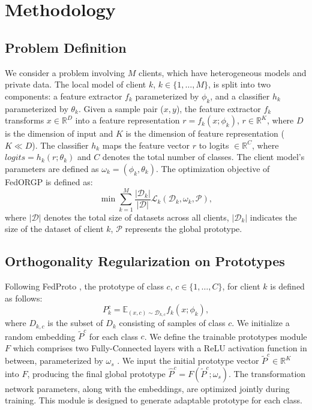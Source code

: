 \section{Methodology}
\label{sec:methodology}

\subsection{Problem Definition}
We consider a problem involving $M$ clients, which have heterogeneous models and private data. The local model of client $k$, $k\in\{1,\dots,M\}$, is split into two components: a feature extractor $f_k$ parameterized by $\phi_k$, and a classifier $h_k$ parameterized by $\theta_k$. Given a sample pair ($x, y$), the feature extractor $f_k$ transforms $x \in \mathbb{R}^{D}$ into a feature representation $r=f_k(x;\phi_k)$, $r \in \mathbb{R}^{K}$, where $D$ is the dimension of input and $K$ is the dimension of feature representation ($K \ll D$). The classifier $h_k$ maps the feature vector $r$ to logits $\in \mathbb{R}^{C}$, where $logits = h_k(r; \theta_k)$ and $C$ denotes the total number of classes. The client model's parameters are defined as $\omega_k = (\phi_k, \theta_k)$. The optimization objective of FedORGP is defined as:
\begin{equation}\min\sum_{k=1}^M\frac{|\mathcal{D}_k|}{|\mathcal{D}|}\mathcal{L}_k\left(\mathcal{D}_k,\omega_k,\mathcal{P}\right),
    \label{eq:overall objective}
\end{equation}
where $|\mathcal{D}|$ denotes the total size of datasets across all clients, $|\mathcal{D}_k|$ indicates the size of the dataset of client $k$, $\mathcal{P}$ represents the global prototype.

\subsection{Orthogonality Regularization on Prototypes}
Following FedProto \cite{tan2022fedproto}, the prototype of class $c$, $c \in \{1, \ldots, C\}$, for client $k$ is defined as follows:
\begin{equation}
    P_k^c=\mathbb{E}_{(x,c)\sim\mathcal{D}_{k,c}}f_k(x;\phi_k),
    \label{eq:client prototype definition}
\end{equation}
where $D_{k, c}$ is the subset of $D_k$ consisting of samples of class $c$. We initialize a random embedding $\tilde{P}^c$ for each class $c$. We define the trainable prototypes module $F$ which comprises two Fully-Connected layers with a ReLU activation function in between, parameterized by $\omega_s$ \cite{fedtgp}. We input the initial prototype vector $\tilde{P}^c\in\mathbb{R}^K$ into $F$, producing the final global prototype $\hat{P}^c=F(\tilde{P}^c;\omega_s)$. The transformation network parameters, along with the embeddings, are optimized jointly during training. This module is designed to generate adaptable prototype for each class.

